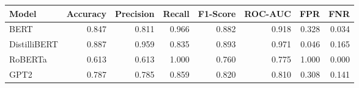 \begin{tabular}{|l||r|r|r|r|r|r|r|}
\toprule
Model & \textbf{Accuracy} & \textbf{Precision} & Recall & \textbf{F1-Score} & \textbf{ROC-AUC} & \textbf{FPR} & FNR \\
\midrule \midrule
BERT & 0.847 & 0.811 & 0.966 & 0.882 & 0.918 & 0.328 & 0.034 \\
DistilliBERT & 0.887 & 0.959 & 0.835 & 0.893 & 0.971 & 0.046 & 0.165 \\
RoBERTa & 0.613 & 0.613 & 1.000 & 0.760 & 0.775 & 1.000 & 0.000 \\
GPT2 & 0.787 & 0.785 & 0.859 & 0.820 & 0.810 & 0.308 & 0.141 \\
\bottomrule
\end{tabular}
